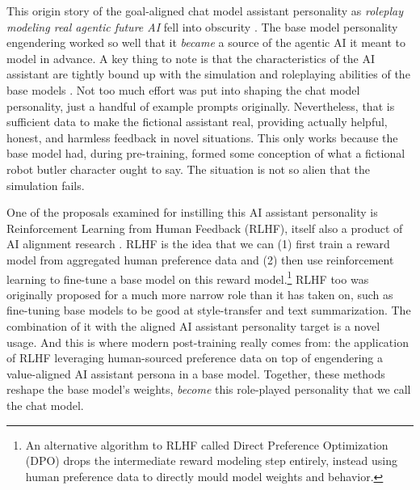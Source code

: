 This origin story of the goal-aligned chat model assistant personality as
\emph{roleplay modeling real agentic future AI} fell into obscurity
\cite{nostalgebraist2025void}. The base model personality engendering worked so
well that it \emph{became} a source of the agentic AI it meant to model in
advance. A key thing to note is that the characteristics of the AI assistant
are tightly bound up with the simulation and roleplaying abilities of the base
models \cite{nostalgebraist2025void}. Not too much effort was put into shaping
the chat model personality, just a handful of example prompts originally.
Nevertheless, that is sufficient data to make the fictional assistant real,
providing actually helpful, honest, and harmless feedback in novel situations.
This only works because the base model had, during pre-training, formed some
conception of what a fictional robot butler character ought to say. The
situation is not so alien that the simulation fails.

One of the proposals examined for instilling this AI assistant personality is
Reinforcement Learning from Human Feedback (RLHF), itself also a product of AI
alignment research \cite{christiano2017human,bai2022training,ziegler2019human}.
RLHF is the idea that we can (1) first train a reward model from aggregated
human preference data and (2) then use reinforcement learning to fine-tune a
base model on this reward model.\footnote{An alternative algorithm to RLHF
called Direct Preference Optimization (DPO) \cite{rafailov2024dpo} drops the
intermediate reward modeling step entirely, instead using human preference data
to directly mould model weights and behavior.} RLHF too was originally proposed
for a much more narrow role than it has taken on, such as fine-tuning base
models to be good at style-transfer and text summarization. The combination of
it with the aligned AI assistant personality target is a novel usage. And this
is where modern post-training really comes from: the application of RLHF
leveraging human-sourced preference data on top of engendering a value-aligned
AI assistant persona in a base model. Together, these methods reshape the base
model's weights, \emph{become} this role-played personality that we call the
chat model.

